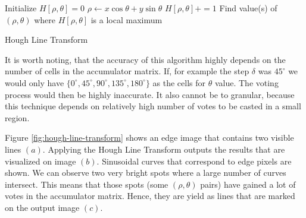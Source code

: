 \begin{algorithm}
	\begin{spacing}{1.5}
	\begin{algorithmic}[1]
			\State Initialize $H[\rho, \theta] = 0$
					\State $\rho \gets x\cos\theta + y\sin\theta$
					\State $H[\rho, \theta] += 1$
				\EndFor
			\EndFor
			\State Find value(s) of $(\rho, \theta)$ where $H[\rho, \theta]$ is a local maximum
		\EndFunction
	\end{algorithmic}
	\end{spacing}
	\caption{Hough Line Transform}
\end{algorithm}

\begin{note}
It is worth noting, that the accuracy of this algorithm highly depends on the number of cells in the accumulator matrix. If, for example the step $\delta$ was $45^{\circ}$ we would only have $\{0^{\circ}, 45^{\circ}, 90^{\circ}, 135^{\circ}, 180^{\circ}\}$ as the cells for $\theta$ value. The voting process would then be highly inaccurate. It also cannot be to granular, because this technique depends on relatively high number of votes to be casted in a small region.
\end{note}

Figure \ref{fig:hough-line-transform} shows an edge image that contains two visible lines $(a)$. Applying the Hough Line Transform outputs the results that are visualized on image $(b)$. Sinusoidal curves that correspond to edge pixels are shown. We can observe two very bright spots where a large number of curves intersect. This means that those spots (some $(\rho, \theta)$ pairs) have gained a lot of votes in the accumulator matrix. Hence, they are yield as lines that are marked on the output image $(c)$.

